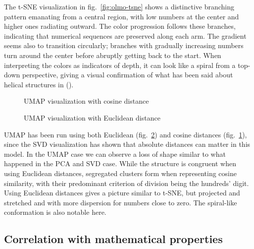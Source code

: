 \documentclass[
  a4paper, twoside, 10pt, titlepage]{book}
\makeatletter
\newcommand*\pandocbounded[1]{%
  \sbox\pandoc@box{#1}%
  \Gscale@div\@tempa{\textheight}{\dimexpr\ht\pandoc@box+\dp\pandoc@box\relax}%
  \Gscale@div\@tempb{\linewidth}{\wd\pandoc@box}%
  \ifdim\@tempb\p@<\@tempa\p@\let\@tempa\@tempb\fi%
  \ifdim\@tempa\p@<\p@\scalebox{\@tempa}{\usebox\pandoc@box}%
  \else\usebox{\pandoc@box}%
  \fi%
}
\makeatother
\begin{document}
The t-SNE visualization in fig.~\ref{fig:olmo-tsne} shows a distinctive
branching pattern emanating from a central region, with low numbers at
the center and higher ones radiating outward. The color progression
follows these branches, indicating that numerical sequences are
preserved along each arm. The gradient seems also to transition
circularly; branches with gradually increasing numbers turn around the
center before abruptly getting back to the start. When interpreting the
colors as indicators of depth, it can look like a spiral from a top-down
perspective, giving a visual confirmation of what has been said about
helical structures in ().

\begin{figure}
\centering
\pandocbounded{}
\caption{UMAP visualization with cosine
distance}\label{fig:olmo-umap-cosine}
\end{figure}

\begin{figure}
\centering
\pandocbounded{}
\caption{UMAP visualization with Euclidean
distance}\label{fig:olmo-umap-euclidean}
\end{figure}

UMAP has been run using both Euclidean
(fig.~\ref{fig:olmo-umap-euclidean}) and cosine distances
(fig.~\ref{fig:olmo-umap-cosine}), since the SVD visualization has shown
that absolute distances can matter in this model. In the UMAP case we
can observe a loss of shape similar to what happened in the PCA and SVD
case. While the structure is congruent when using Euclidean distances,
segregated clusters form when representing cosine similarity, with their
predominant criterion of division being the hundreds' digit. Using
Euclidean distances gives a picture similar to t-SNE, but projected and
stretched and with more dispersion for numbers close to zero. The
spiral-like conformation is also notable here.

\subsection{Correlation with mathematical
properties}\label{correlation-with-mathematical-properties}
\end{document}

